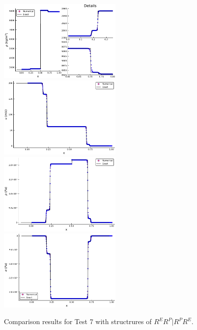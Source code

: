\documentclass[review]{elsarticle}
\begin{document}
\begin{enumerate}[Step 1]
\begin{figure}
  \centering
  \includegraphics[width= 6cm] {case6rho.pdf}
  \includegraphics[width= 6cm] {case6u.pdf}
  \includegraphics[width= 6cm] {case6p.pdf}
  \includegraphics[width= 6cm] {case6sigma.pdf}

    \caption{Comparison results for Test 7 with structrures of $R^ER^P|R^PR^E$.  }
  \label{fig:case7}
\end{figure}

%
%

\end{enumerate}
\end{document}
